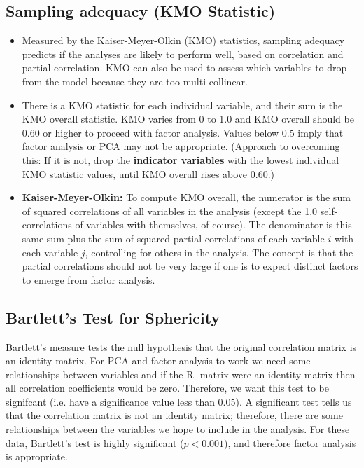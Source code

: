 \documentclass[a4paper,12pt]{article}
\begin{document}
\subsection{Sampling adequacy (KMO Statistic)}
\begin{itemize}
\item Measured by the Kaiser-Meyer-Olkin (KMO) statistics, sampling adequacy predicts if the analyses are likely to perform well, based on correlation and partial correlation. KMO can also be used to assess which variables to drop from the model because they are too multi-collinear.

\item There is a KMO statistic for each individual variable, and their sum is the KMO overall statistic. KMO varies from 0 to 1.0 and KMO overall should be 0.60 or higher to proceed with factor analysis. Values below 0.5 imply that factor analysis or PCA may not be appropriate. (Approach to overcoming this: If it is not, drop the \textbf{indicator variables} with the lowest individual KMO statistic values, until KMO overall rises above 0.60.)

\item \textbf{Kaiser-Meyer-Olkin:} To compute KMO overall, the numerator is the sum of squared correlations of all variables in the analysis (except the 1.0 self-correlations of variables with themselves, of course). The denominator is this same sum plus the sum of squared partial correlations of each variable $i$ with each variable $j$, controlling for others in the analysis. The concept is that the partial correlations should not be very large if one is to expect distinct factors to emerge from factor analysis.
\end{itemize}
\subsection{Bartlett's Test for Sphericity}
Bartlett's measure tests the null hypothesis that the original correlation matrix is an identity
matrix. For PCA and factor analysis to work we need some relationships between variables and if the R-
matrix were an identity matrix then all correlation coefficients would be zero. Therefore, we
want this test to be signifcant (i.e. have a significance value less than 0.05). A significant test
tells us that the correlation matrix is not an identity matrix; therefore, there are some relationships
between the variables we hope to include in the analysis. For these data, Bartlett's test is
highly significant ($p < 0.001$), and therefore factor analysis is appropriate.

\end{document}
